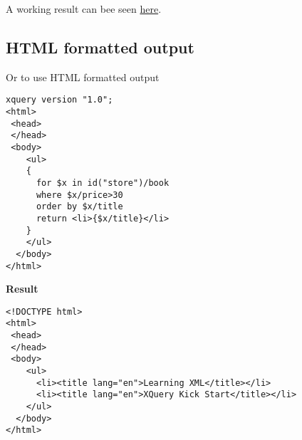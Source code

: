 A working result can bee seen \href{http://videlibri.sourceforge.net/cgi-bin/xidelcgi?&data=%3Cbookstore%20id%3D%22store%22%3E%20%20%0A%20%20%3Cbook%20category%3D%22COOKING%22%3E%0A%20%20%20%20%3Ctitle%20lang%3D%22en%22%3EEveryday%20Italian%3C%2Ftitle%3E%0A%20%20%20%20%3Cauthor%3EGiada%20De%20Laurentiis%3C%2Fauthor%3E%0A%20%20%20%20%3Cyear%3E2005%3C%2Fyear%3E%0A%20%20%20%20%3Cprice%3E30.00%3C%2Fprice%3E%0A%20%20%3C%2Fbook%3E%0A%20%20%20%20%3Cbook%20category%3D%22CHILDREN%22%3E%0A%20%20%20%20%3Ctitle%20lang%3D%22en%22%3EHarry%20Potter%3C%2Ftitle%3E%0A%20%20%20%20%3Cauthor%3EJ%20K.%20Rowling%3C%2Fauthor%3E%0A%20%20%20%20%3Cyear%3E2005%3C%2Fyear%3E%0A%20%20%20%20%3Cprice%3E29.99%3C%2Fprice%3E%0A%20%20%3C%2Fbook%3E%0A%20%20%3Cbook%20category%3D%22WEB%22%3E%0A%20%20%20%20%3Ctitle%20lang%3D%22en%22%3EXQuery%20Kick%20Start%3C%2Ftitle%3E%0A%20%20%20%20%3Cauthor%3EJames%20McGovern%3C%2Fauthor%3E%0A%20%20%20%20%3Cauthor%3EPer%20Bothner%3C%2Fauthor%3E%0A%20%20%20%20%3Cauthor%3EKurt%20Cagle%3C%2Fauthor%3E%0A%20%20%20%20%3Cauthor%3EJames%20Linn%3C%2Fauthor%3E%0A%20%20%20%20%3Cauthor%3EVaidyanathan%20Nagarajan%3C%2Fauthor%3E%0A%20%20%20%20%3Cyear%3E2003%3C%2Fyear%3E%0A%20%20%20%20%3Cprice%3E49.99%3C%2Fprice%3E%0A%20%20%3C%2Fbook%3E%0A%20%20%3Cbook%20category%3D%22WEB%22%3E%0A%20%20%20%20%3Ctitle%20lang%3D%22en%22%3ELearning%20XML%3C%2Ftitle%3E%0A%20%20%20%20%3Cauthor%3EErik%20T.%20Ray%3C%2Fauthor%3E%0A%20%20%20%20%3Cyear%3E2003%3C%2Fyear%3E%0A%20%20%20%20%3Cprice%3E39.95%3C%2Fprice%3E%0A%20%20%3C%2Fbook%3E%0A%3C%2Fbookstore%3E%20%0A&=&extract=xquery%20version%20%221.0%22%3B%0A%0A%0Adeclare%20function%20local%3Asearch(%24doc%20as%20element())%7B%0A%20for%20%24x%20in%20%24doc%2Fbook%0A%20%20where%20%24x%2Fprice%3E30%0A%20%20%20order%20by%20%24x%2Ftitle%0A%20%20return%20%24x%2Ftitle%0A%7D%3B%0A%0Alocal%3Asearch(id(%22store%22))&=&input-format=xml&printed-node-format=text&output-format=adhoc&compatibility=Enable%20all%20extensions&dot-notation=unambiguous&extract-kind=xquery1}{here}.

\subsection{HTML formatted output}
Or to use HTML formatted output
\begin{lstlisting}[frame=single, style=htmlcssjs, caption={query with HTML output}]
xquery version "1.0";
<html>
 <head>
 </head>
 <body>
    <ul>
    {
      for $x in id("store")/book
      where $x/price>30
      order by $x/title
      return <li>{$x/title}</li>
    }
    </ul>
  </body>
</html>
\end{lstlisting}
\textbf{Result}
\begin{lstlisting}[frame=single, style=htmlcssjs, caption={result}]
<!DOCTYPE html>
<html>
 <head>
 </head>
 <body>
    <ul>
      <li><title lang="en">Learning XML</title></li>
      <li><title lang="en">XQuery Kick Start</title></li>
    </ul>
  </body>
</html>
\end{lstlisting}

%
